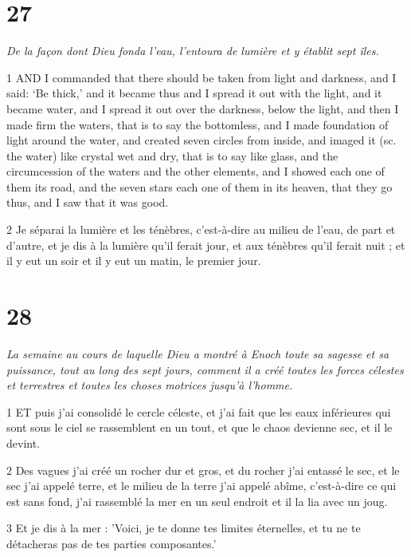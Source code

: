 \chapter{27}

\par \textit{De la façon dont Dieu fonda l'eau, l'entoura de lumière et y établit sept îles.}

\par 1 AND I commanded that there should be taken from light and darkness, and I said: ‘Be thick,’ and it became thus and I spread it out with the light, and it became water, and I spread it out over the darkness, below the light, and then I made firm the waters, that is to say the bottomless, and I made foundation of light around the water, and created seven circles from inside, and imaged it (sc. the water) like crystal wet and dry, that is to say like glass, and the circumcession of the waters and the other elements, and I showed each one of them its road, and the seven stars each one of them in its heaven, that they go thus, and I saw that it was good.

\par 2 Je séparai la lumière et les ténèbres, c'est-à-dire au milieu de l'eau, de part et d'autre, et je dis à la lumière qu'il ferait jour, et aux ténèbres qu'il ferait nuit ; et il y eut un soir et il y eut un matin, le premier jour.

\chapter{28}

\par \textit{La semaine au cours de laquelle Dieu a montré à Enoch toute sa sagesse et sa puissance, tout au long des sept jours, comment il a créé toutes les forces célestes et terrestres et toutes les choses motrices jusqu'à l'homme.}

\par 1 ET puis j'ai consolidé le cercle céleste, et j'ai fait que les eaux inférieures qui sont sous le ciel se rassemblent en un tout, et que le chaos devienne sec, et il le devint.

\par 2 Des vagues j'ai créé un rocher dur et gros, et du rocher j'ai entassé le sec, et le sec j'ai appelé terre, et le milieu de la terre j'ai appelé abîme, c'est-à-dire ce qui est sans fond, j'ai rassemblé la mer en un seul endroit et il la lia avec un joug.

\par 3 Et je dis à la mer : 'Voici, je te donne tes limites éternelles, et tu ne te détacheras pas de tes parties composantes.'

